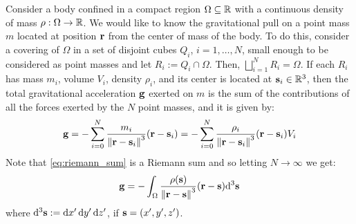 \documentclass[../main.tex]{subfiles}
\begin{document}
Consider a body confined in a compact region $\Omega\subseteq\mathbb{R}$ with a continuous density of mass $\rho:\Omega\to\mathbb{R}$. We would like to know the gravitational pull on a point mass $m$ located at position $\boldsymbol{\mathrm{r}}$ from the center of mass of the body. To do this, consider a covering of $\Omega$ in a set of disjoint cubes $Q_i$, $i=1,\dots,N$, small enough to be considered as point masses and let $R_i:=Q_i\cap \Omega$. Then, $\bigsqcup_{i=1}^NR_i=\Omega$. If each $R_i$ has mass $m_i$, volume $V_i$, density $\rho_i$, and its center is located at $\boldsymbol{\mathrm{s}}_i\in\mathbb{R}^3$, then the total gravitational acceleration $\boldsymbol{\mathrm{g}}$ exerted on $m$ is the sum of the contributions of all the forces exerted by the $N$ point masses, and it is given by:
\begin{equation}\label{eq:riemann_sum}
  \boldsymbol{\mathrm{g}}=-\sum_{i=0}^{N}\frac{m_{i}}{\left\|\boldsymbol{\mathrm{r}}-\boldsymbol{\mathrm{s}}_{i}\right\|^3}(\boldsymbol{\mathrm{r}}-\boldsymbol{\mathrm{s}}_{i})=-\sum_{i=0}^{N}\frac{\rho_{i}}{\left\|\boldsymbol{\mathrm{r}}-\boldsymbol{\mathrm{s}}_{i}\right\|^3}(\boldsymbol{\mathrm{r}}-\boldsymbol{\mathrm{s}}_{i})V_i
\end{equation}
Note that \cref{eq:riemann_sum} is a Riemann sum and so letting $N\to\infty$ we get:
\begin{equation}\label{eq:limit}
  \boldsymbol{\mathrm{g}}=-\int_{\Omega}\frac{\rho(\boldsymbol{\mathrm{s}})}{\left\|\boldsymbol{\mathrm{r}}-\boldsymbol{\mathrm{s}}\right\|^3}(\boldsymbol{\mathrm{r}}-\boldsymbol{\mathrm{s}})\dd^3{\boldsymbol{\mathrm{s}}}
\end{equation}
where $\dd^3{\boldsymbol{\mathrm{s}}}:=\dd{x'}\dd{y'}\dd{z'}$, if $\boldsymbol{\mathrm{s}}=(x',y',z')$.
\end{document}
